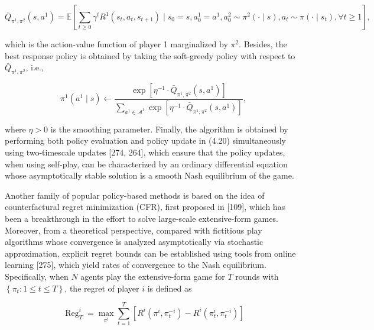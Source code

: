 \documentclass[10pt]{article}
\begin{document}
\[
\bar{Q}_{\pi^{1}, \pi^{2}}\left(s, a^{1}\right)=\mathbb{E}\left[\sum_{t \geq 0} \gamma^{t} R^{1}\left(s_{t}, a_{t}, s_{t+1}\right) \mid s_{0}=s, a_{0}^{1}=a^{1}, a_{0}^{2} \sim \pi^{2}(\cdot \mid s), a_{t} \sim \pi\left(\cdot \mid s_{t}\right), \forall t \geq 1\right],
\]

which is the action-value function of player 1 marginalized by $\pi^{2}$. Besides, the best response policy is obtained by taking the soft-greedy policy with respect to $\bar{Q}_{\pi^{1}, \pi^{2}}$, i.e.,

\[
\pi^{1}\left(a^{1} \mid s\right) \leftarrow \frac{\exp \left[\eta^{-1} \cdot \bar{Q}_{\pi^{1}, \pi^{2}}\left(s, a^{1}\right)\right]}{\sum_{a^{1} \in \mathcal{A}^{1}} \exp \left[\eta^{-1} \cdot \bar{Q}_{\pi^{1}, \pi^{2}}\left(s, a^{1}\right)\right]},
\]

where $\eta>0$ is the smoothing parameter. Finally, the algorithm is obtained by performing both policy evaluation and policy update in (4.20) simultaneously using two-timescale updates [274, 264], which ensure that the policy updates, when using self-play, can be characterized by an ordinary differential equation whose asymptotically stable solution is a smooth Nash equilibrium of the game.

Another family of popular policy-based methods is based on the idea of counterfactural regret minimization (CFR), first proposed in [109], which has been a breakthrough in the effort to solve large-scale extensive-form games. Moreover, from a theoretical perspective, compared with fictitious play algorithms whose convergence is analyzed asymptotically via stochastic approximation, explicit regret bounds can be established using tools from online learning [275], which yield rates of convergence to the Nash equilibrium. Specifically, when $N$ agents play the extensive-form game for $T$ rounds with $\left\{\pi_{t}: 1 \leq t \leq T\right\}$, the regret of player $i$ is defined as

\[
\operatorname{Reg}_{T}^{i}=\max _{\pi^{i}} \sum_{t=1}^{T}\left[R^{i}\left(\pi^{i}, \pi_{t}^{-i}\right)-R^{i}\left(\pi_{t}^{i}, \pi_{t}^{-i}\right)\right]
\]
\end{document}
